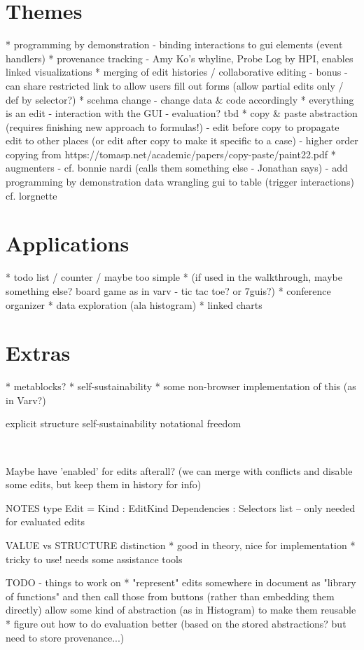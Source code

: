 \documentclass[sigconf]{acmart}
\begin{document}
\section{Themes}
* programming by demonstration
  - binding interactions to gui elements (event handlers)
* provenance tracking
  - Amy Ko's whyline, Probe Log by HPI, enables linked visualizations
* merging of edit histories / collaborative editing
  - bonus - can share restricted link to allow users fill out
    forms (allow partial edits only / def by selector?)
* scehma change - change data \& code accordingly
* everything is an edit
  - interaction with the GUI
  - evaluation? tbd
* copy \& paste abstraction
    (requires finishing new approach to formulas!)
  - edit before copy to propagate edit to other places
    (or edit after copy to make it specific to a case)
  - higher order copying from https://tomasp.net/academic/papers/copy-paste/paint22.pdf
* augmenters
  - cf. bonnie nardi (calls them something else - Jonathan says)
  - add programming by demonstration data wrangling gui to table (trigger interactions)
    cf. lorgnette

\section{Applications}
* todo list / counter / maybe too simple
* (if used in the walkthrough, maybe something else? board game as in varv - tic tac toe? or 7guis?)
* conference organizer
* data exploration (ala histogram)
* linked charts

\section{Extras}
* metablocks?
* self-sustainability
* some non-browser implementation of this (as in Varv?)

explicit structure
self-sustainability
notational freedom

\newpage
~

Maybe have 'enabled' for edits afterall?
(we can merge with conflicts and disable some edits, but keep them in history for info)

NOTES
type Edit =
  { Kind : EditKind
    Dependencies : Selectors list }  -- only needed for evaluated edits

VALUE vs STRUCTURE distinction
* good in theory, nice for implementation
* tricky to use! needs some assistance tools

TODO - things to work on
* "represent" edits somewhere in document as "library of functions"
  and then call those from buttons (rather than embedding them directly)
  allow some kind of abstraction (as in Histogram) to make them reusable
* figure out how to do evaluation better
  (based on the stored abstractions? but need to store provenance...)
\end{document}
